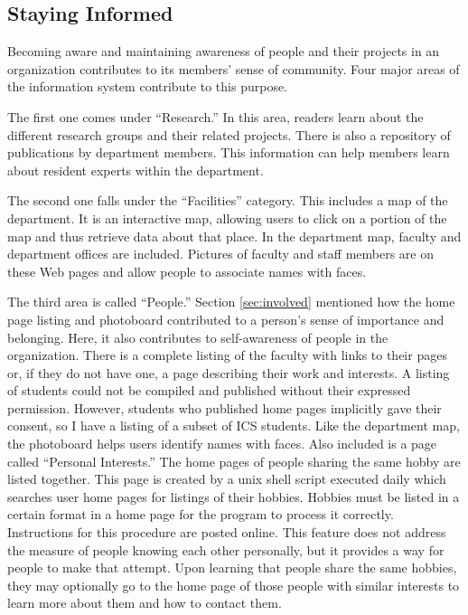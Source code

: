 \subsection{Staying Informed}

Becoming aware and maintaining awareness of people and their projects in an
organization contributes to its members' sense of community.  Four major areas
of the information system contribute to this purpose.

The first one comes under ``Research.''  In this area, readers learn about the
different research groups and their related projects.  There is also a
repository of publications by department members.  This information can help
members learn about resident experts within the department.

The second one falls under the ``Facilities'' category.  This includes a map of
the department.  It is an interactive map, allowing users to click on a portion
of the map and thus retrieve data about that place.  In the department map,
faculty and department offices are included.  Pictures of faculty and staff
members are on these Web pages and allow people to associate names with faces.

The third area is called ``People.''  Section \ref{sec:involved} mentioned how
the home page listing and photoboard contributed to a person's sense of
importance and belonging.  Here, it also contributes to self-awareness of
people in the organization.  There is a complete listing of the faculty with
links to their pages or, if they do not have one, a page describing their work
and interests.  A listing of students could not be compiled and published
without their expressed permission.  However, students who published home pages
implicitly gave their consent, so I have a listing of a subset of ICS students.
Like the department map, the photoboard helps users identify names with faces.
Also included is a page called ``Personal Interests.''  The home pages of
people sharing the same hobby are listed together.  This page is created by a
unix shell script executed daily which searches user home pages for listings of
their hobbies.  Hobbies must be listed in a certain format in a home page for
the program to process it correctly.  Instructions for this procedure are
posted online.  This feature does not address the measure of people knowing
each other personally, but it provides a way for people to make that attempt.
Upon learning that people share the same hobbies, they may optionally go to the
home page of those people with similar interests to learn more about them and
how to contact them.

